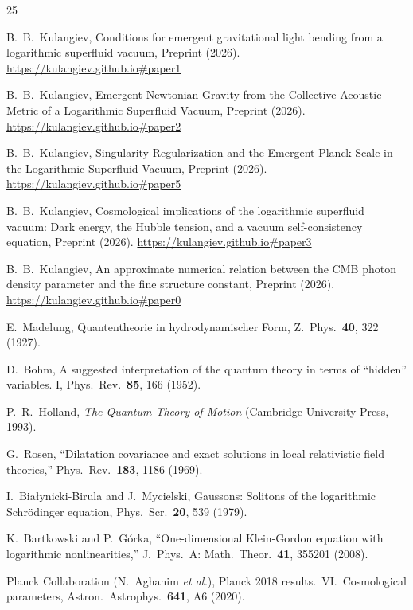 \documentclass[12pt, a4paper]{article}
\begin{document}
\begin{thebibliography}{25}

B.~B.~Kulangiev,
Conditions for emergent gravitational light bending from a logarithmic superfluid vacuum,
Preprint (2026). \url{https://kulangiev.github.io#paper1}

B.~B.~Kulangiev,
Emergent Newtonian Gravity from the Collective Acoustic Metric of a Logarithmic Superfluid Vacuum,
Preprint (2026). \url{https://kulangiev.github.io#paper2}

B.~B.~Kulangiev,
Singularity Regularization and the Emergent Planck Scale in the Logarithmic Superfluid Vacuum,
Preprint (2026). \url{https://kulangiev.github.io#paper5}

B.~B.~Kulangiev,
Cosmological implications of the logarithmic superfluid vacuum: Dark energy, the Hubble tension, and a vacuum self-consistency equation,
Preprint (2026). 
\url{https://kulangiev.github.io#paper3}

B.~B.~Kulangiev,
An approximate numerical relation between the CMB photon density parameter and the fine structure constant,
Preprint (2026). 
\url{https://kulangiev.github.io#paper0}

E.~Madelung,
Quantentheorie in hydrodynamischer Form,
Z.\ Phys.\ \textbf{40}, 322 (1927).

D.~Bohm,
A suggested interpretation of the quantum theory in terms of ``hidden'' variables. I,
Phys.\ Rev.\ \textbf{85}, 166 (1952).

P.~R.~Holland,
\emph{The Quantum Theory of Motion} (Cambridge University Press, 1993).

G.~Rosen,
``Dilatation covariance and exact solutions in local relativistic field theories,''
Phys.\ Rev.\ \textbf{183}, 1186 (1969).

I.~Bia\l{}ynicki-Birula and J.~Mycielski,
Gaussons: Solitons of the logarithmic Schr\"{o}dinger equation,
Phys.\ Scr.\ \textbf{20}, 539 (1979).

K.~Bartkowski and P.~G\'{o}rka,
``One-dimensional Klein-Gordon equation with logarithmic nonlinearities,''
J.\ Phys.\ A: Math.\ Theor.\ \textbf{41}, 355201 (2008).

Planck Collaboration (N.~Aghanim \emph{et al.}),
Planck 2018 results.\ VI.\ Cosmological parameters,
Astron.\ Astrophys.\ \textbf{641}, A6 (2020).


\end{thebibliography}
\end{document}
